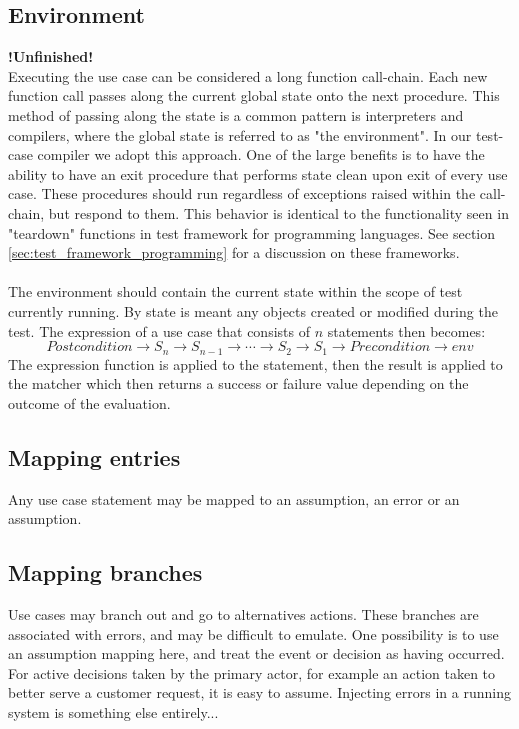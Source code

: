 \subsection{Environment}
\textbf{!Unfinished!}\\
Executing the use case can be considered a long function call-chain. Each new function call passes along the current global state onto the next procedure. This method of passing along the state is a common pattern is interpreters and compilers, where the global state is referred to as "the environment". In our test-case compiler we adopt this approach. One of the large benefits is to have the ability to have an exit procedure that performs state clean upon exit of every use case. These procedures should run regardless of exceptions raised within the call-chain, but respond to them. This behavior is identical to the functionality seen in "teardown" functions in test framework for programming languages. See section \ref{sec:test_framework_programming} for a discussion on these frameworks.\\\\
The environment should contain the current state within the scope of test currently running. By state is meant any objects created or modified during the test.
The expression of a use case that consists of $n$ statements then becomes: 
\begin{equation}
Postcondition \rightarrow S_n \rightarrow S_{n-1} \rightarrow \dotsb \rightarrow S_2 \rightarrow S_1 \rightarrow Precondition \rightarrow env
\end{equation}
The expression function is applied to the statement, then the result is applied to the matcher which then returns a success or failure value depending on the outcome of the evaluation.


\subsection{Mapping entries}
Any use case statement may be mapped to an assumption, an error or an assumption.

\subsection{Mapping branches}
Use cases may branch out and go to alternatives actions. These branches are associated with errors, and may be difficult to emulate. One possibility is to use an assumption mapping here, and treat the event or decision as having occurred. For active decisions taken by the primary actor, for example an action taken to better serve a customer request, it is easy to assume. Injecting errors in a running system is something else entirely... %

